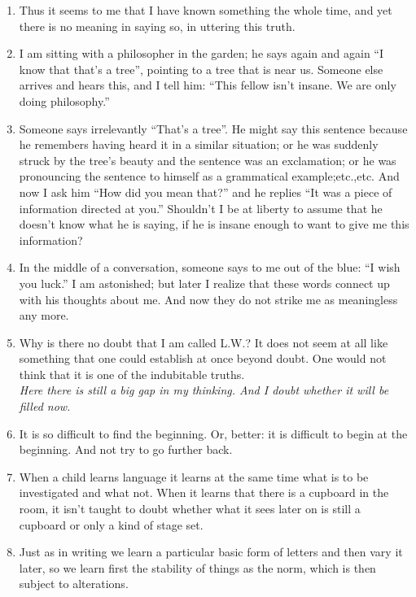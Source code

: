 \documentclass{book}
\begin{document}
\begin{enumerate}
\item
Thus it seems to me that I have known something the whole time, and yet there
is no meaning in saying so, in uttering this truth.

\item
I am sitting with a philosopher in the garden; he says again and again ``I know
that that's a tree'', pointing to a tree that is near us. Someone else arrives
and hears this, and I tell him: ``This fellow isn't insane. We are only doing
philosophy.''

\item
Someone says irrelevantly ``That's a tree''. He might say this sentence because
he remembers having heard it in a similar situation; or he was suddenly struck
by the tree's beauty and the sentence was an exclamation; or he was pronouncing
the sentence to himself as a grammatical example;etc.,etc. And now I ask him
``How did you mean that?'' and he replies ``It was a piece of information
directed at you.'' Shouldn't I be at liberty to assume that he doesn't know
what he is saying, if he is insane enough to want to give me this information?

\item
In the middle of a conversation, someone says to me out of the blue: ``I wish
you luck.'' I am astonished; but later I realize that these words connect up
with his thoughts about me. And now they do not strike me as meaningless any
more.

\item
Why is there no doubt that I am called L.W.? It does not seem at all like
something that one could establish at once beyond doubt. One would not think
that it is one of the indubitable truths.
\\
\emph{Here there is still a big gap in my thinking. And I doubt whether it will
be filled now.}

\item
It is so difficult to find the beginning. Or, better: it is difficult to begin
at the beginning. And not try to go further back.

\item
When a child learns language it learns at the same time what is to be
investigated and what not. When it learns that there is a cupboard in the room,
it isn't taught to doubt whether what it sees later on is still a cupboard or
only a kind of stage set.

\item
Just as in writing we learn a particular basic form of letters and then vary it
later, so we learn first the stability of things as the norm, which is then
subject to alterations.


\end{enumerate}
\end{document}
